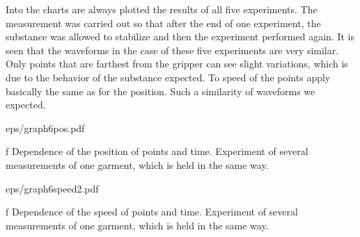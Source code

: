 Into the charts are always plotted the results of all five experiments. The measurement was carried out so that after the end of one experiment, the substance was allowed to stabilize and then the experiment performed again. It is seen that the waveforms in the case of these five experiments are very similar. Only points that are farthest from the gripper can see slight variations, which is due to the behavior of the substance expected. To speed of the points apply basically the same as for the position. Such a similarity of waveforms we expected.


\midinsert {}
\picw=18cm 
\cinspic eps/graph6pos.pdf
\caption/f Dependence of the position of points and time. Experiment of several measurements of one garment, which is held in the same way.
\endinsert

\midinsert {}
\picw=18cm 
\cinspic eps/graph6speed2.pdf
\caption/f Dependence of the speed of points and time. Experiment of several measurements of one garment, which is held in the same way.
\endinsert









